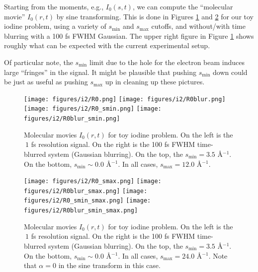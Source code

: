 \documentclass[fleqn,oneside,12pt]{article}
\begin{document}
Starting from the moments, e.g., $I_{0} (s, t)$, we can compute the ``molecular
movie'' $I_{0} (r, t)$ by sine transforming. This is done in Figures
\ref{fig:IR} and \ref{fig:IR2} for our toy iodine problem, using a variety of
$s_{\mathrm{min}}$ and $s_{\mathrm{max}}$ cutoffs, and without/with time
blurring with a 100 fs FWHM Gaussian. The upper right figure in Figure
\ref{fig:IR} shows roughly what can be expected with the current experimental
setup. 

Of particular note, the $s_{\mathrm{min}}$ limit due to the hole for the
electron beam induces large ``fringes'' in the signal. It might be plausible
that pushing $s_{\mathrm{min}}$ down could be just as useful as pushing
$s_{\mathrm{max}}$ up in cleaning up these pictures. 

\begin{figure}[h!]
\begin{center}
\texttt{[image: figures/i2/R0.png]}
\texttt{[image: figures/i2/R0blur.png]}
\texttt{[image: figures/i2/R0\_smin.png]}
\texttt{[image: figures/i2/R0blur\_smin.png]}
\caption{Molecular movies $I_0(r, t)$ for toy iodine problem.  On the left is the
$~1$ fs resolution signal. On the right is the 100 fs FWHM time-blurred system
(Gaussian blurring). On the top, the $s_{\mathrm{min}} = 3.5$ \AA{}$^{-1}$. On
the bottom, $s_{\mathrm{min}} \sim 0.0$ \AA{}$^{-1}$. In all cases,
$s_{\mathrm{max}} = 12.0$ \AA{}$^{-1}$.
}
\label{fig:IR}
\end{center}
\end{figure}

\begin{figure}[h!]
\begin{center}
\texttt{[image: figures/i2/R0\_smax.png]}
\texttt{[image: figures/i2/R0blur\_smax.png]}
\texttt{[image: figures/i2/R0\_smin\_smax.png]}
\texttt{[image: figures/i2/R0blur\_smin\_smax.png]}
\caption{Molecular movies $I_0(r, t)$ for toy iodine problem.  On the left is the
$~1$ fs resolution signal. On the right is the 100 fs FWHM time-blurred system
(Gaussian blurring). On the top, the $s_{\mathrm{min}} = 3.5$ \AA{}$^{-1}$. On
the bottom, $s_{\mathrm{min}} \sim 0.0$ \AA{}$^{-1}$. In all cases,
$s_{\mathrm{max}} = 24.0$ \AA{}$^{-1}$. Note that $\alpha = 0$ in the sine
transform in this case.
}
\label{fig:IR2}
\end{center}
\end{figure}
\end{document}
